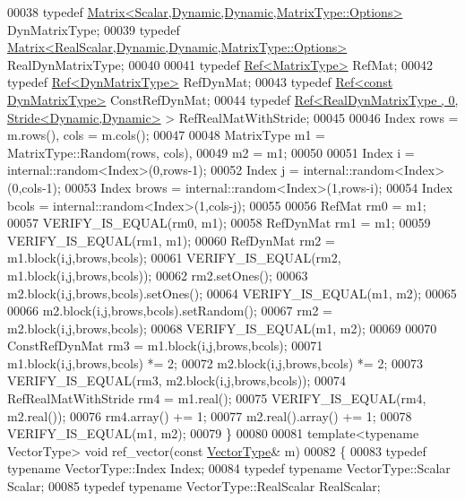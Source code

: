\begin{DoxyCode}
00038   \textcolor{keyword}{typedef} \hyperlink{group___core___module_class_eigen_1_1_matrix}{Matrix<Scalar,Dynamic,Dynamic,MatrixType::Options>}
       DynMatrixType;
00039   \textcolor{keyword}{typedef} \hyperlink{group___core___module_class_eigen_1_1_matrix}{Matrix<RealScalar,Dynamic,Dynamic,MatrixType::Options>}
       RealDynMatrixType;
00040   
00041   \textcolor{keyword}{typedef} \hyperlink{group___core___module_class_eigen_1_1_ref}{Ref<MatrixType>} RefMat;
00042   \textcolor{keyword}{typedef} \hyperlink{group___core___module_class_eigen_1_1_ref}{Ref<DynMatrixType>} RefDynMat;
00043   \textcolor{keyword}{typedef} \hyperlink{group___core___module_class_eigen_1_1_ref}{Ref<const DynMatrixType>} ConstRefDynMat;
00044   \textcolor{keyword}{typedef} \hyperlink{group___core___module_class_eigen_1_1_ref}{Ref<RealDynMatrixType , 0, Stride<Dynamic,Dynamic>}
       > RefRealMatWithStride;
00045 
00046   Index rows = m.rows(), cols = m.cols();
00047   
00048   MatrixType  m1 = MatrixType::Random(rows, cols),
00049               m2 = m1;
00050   
00051   Index i = internal::random<Index>(0,rows-1);
00052   Index j = internal::random<Index>(0,cols-1);
00053   Index brows = internal::random<Index>(1,rows-i);
00054   Index bcols = internal::random<Index>(1,cols-j);
00055   
00056   RefMat rm0 = m1;
00057   VERIFY\_IS\_EQUAL(rm0, m1);
00058   RefDynMat rm1 = m1;
00059   VERIFY\_IS\_EQUAL(rm1, m1);
00060   RefDynMat rm2 = m1.block(i,j,brows,bcols);
00061   VERIFY\_IS\_EQUAL(rm2, m1.block(i,j,brows,bcols));
00062   rm2.setOnes();
00063   m2.block(i,j,brows,bcols).setOnes();
00064   VERIFY\_IS\_EQUAL(m1, m2);
00065   
00066   m2.block(i,j,brows,bcols).setRandom();
00067   rm2 = m2.block(i,j,brows,bcols);
00068   VERIFY\_IS\_EQUAL(m1, m2);
00069   
00070   ConstRefDynMat rm3 = m1.block(i,j,brows,bcols);
00071   m1.block(i,j,brows,bcols) *= 2;
00072   m2.block(i,j,brows,bcols) *= 2;
00073   VERIFY\_IS\_EQUAL(rm3, m2.block(i,j,brows,bcols));
00074   RefRealMatWithStride rm4 = m1.real();
00075   VERIFY\_IS\_EQUAL(rm4, m2.real());
00076   rm4.array() += 1;
00077   m2.real().array() += 1;
00078   VERIFY\_IS\_EQUAL(m1, m2);
00079 \}
00080 
00081 \textcolor{keyword}{template}<\textcolor{keyword}{typename} VectorType> \textcolor{keywordtype}{void} ref\_vector(\textcolor{keyword}{const} \hyperlink{struct_vector_type}{VectorType}& m)
00082 \{
00083   \textcolor{keyword}{typedef} \textcolor{keyword}{typename} VectorType::Index Index;
00084   \textcolor{keyword}{typedef} \textcolor{keyword}{typename} VectorType::Scalar Scalar;
00085   \textcolor{keyword}{typedef} \textcolor{keyword}{typename} VectorType::RealScalar RealScalar;

\end{DoxyCode}
